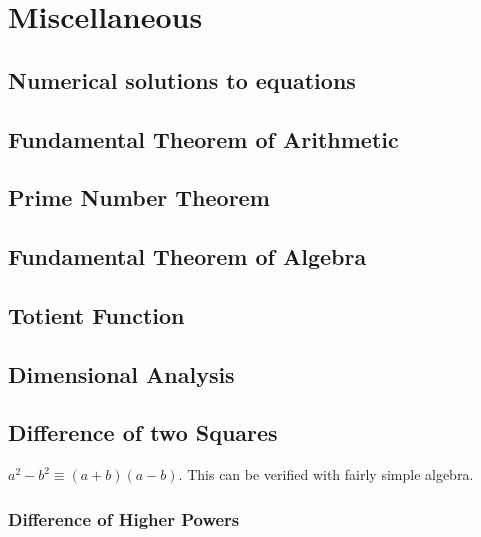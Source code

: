 \documentclass[a4paper,11pt]{article}
\newtheorem{thm}{Theorem}
\begin{document}
    \section{Miscellaneous}

%

    \subsection{Numerical solutions to equations}

    \subsection{Fundamental Theorem of Arithmetic}

    \subsection{Prime Number Theorem}

    \subsection{Fundamental Theorem of Algebra}

    \subsection{Totient Function} \label{sec:totient}

    \subsection{Dimensional Analysis}

    \subsection{Difference of two Squares}

    $a^2 - b^2 \equiv (a + b)(a - b)$. This can be verified with fairly simple
    algebra.

    \subsubsection{Difference of Higher Powers}
\end{document}
